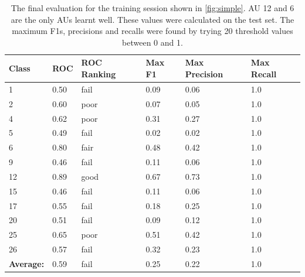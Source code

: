     \begin{table}[!h]
    \centering
    {\small
    \begin{tabular}{llllll}
    \hline
    \textbf{Class}    & \textbf{ROC} & \textbf{ROC Ranking} & \textbf{Max F1} & \textbf{Max Precision} & \textbf{Max Recall} \\ \hline
    1                 & 0.50         & fail         & 0.09            & 0.06                   & 1.0                 \\
    2                 & 0.60         & poor         & 0.07            & 0.05                   & 1.0                 \\
    4                 & 0.62         & poor         & 0.31            & 0.27                   & 1.0                 \\
    5                 & 0.49         & fail         & 0.02            & 0.02                   & 1.0                 \\
    6                 & 0.80         & fair         & 0.48            & 0.42                   & 1.0                 \\
    9                 & 0.46         & fail         & 0.11            & 0.06                   & 1.0                 \\
    12                & 0.89         & good         & 0.67            & 0.73                   & 1.0                 \\
    15                & 0.46         & fail         & 0.11            & 0.06                   & 1.0                 \\
    17                & 0.55         & fail         & 0.18            & 0.25                   & 1.0                 \\
    20                & 0.51         & fail         & 0.09            & 0.12                   & 1.0                 \\
    25                & 0.65         & poor         & 0.51            & 0.42                   & 1.0                 \\
    26                & 0.57         & fail         & 0.32            & 0.23                   & 1.0                 \\ \hline
    \textbf{Average:} & 0.59         & fail         & 0.25            & 0.22                   & 1.0                 \\ \hline
    \end{tabular} }
    \caption{The final evaluation for the training session shown in \ref{fig:simple}.
    AU 12 and 6 are the only AUs learnt well. These values were
    calculated on the test set. The maximum F1s, precisions and recalls
    were found by trying 20 threshold values between 0 and 1.}
    \label{my-label}
    \end{table}
  \clearpage
